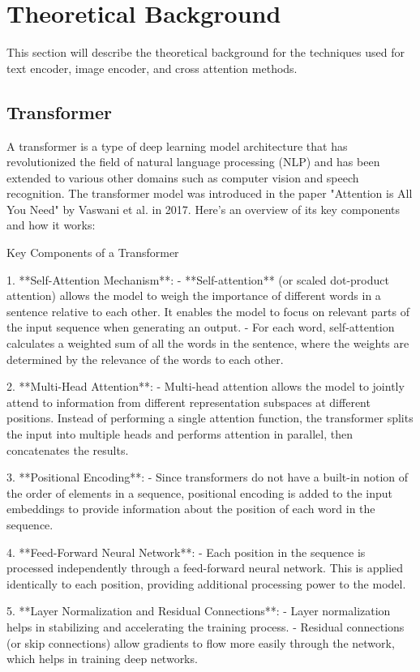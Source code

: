 \chapter{Theoretical Background}
This section will describe the theoretical background for the techniques used for text encoder, image encoder, and cross attention methods. 
\section{Transformer}
A transformer is a type of deep learning model architecture that has revolutionized the field of natural language processing (NLP) and has been extended to various other domains such as computer vision and speech recognition. The transformer model was introduced in the paper "Attention is All You Need" by Vaswani et al. in 2017. Here's an overview of its key components and how it works:

 Key Components of a Transformer

1. **Self-Attention Mechanism**:
   - **Self-attention** (or scaled dot-product attention) allows the model to weigh the importance of different words in a sentence relative to each other. It enables the model to focus on relevant parts of the input sequence when generating an output.
   - For each word, self-attention calculates a weighted sum of all the words in the sentence, where the weights are determined by the relevance of the words to each other.

2. **Multi-Head Attention**:
   - Multi-head attention allows the model to jointly attend to information from different representation subspaces at different positions. Instead of performing a single attention function, the transformer splits the input into multiple heads and performs attention in parallel, then concatenates the results.

3. **Positional Encoding**:
   - Since transformers do not have a built-in notion of the order of elements in a sequence, positional encoding is added to the input embeddings to provide information about the position of each word in the sequence.

4. **Feed-Forward Neural Network**:
   - Each position in the sequence is processed independently through a feed-forward neural network. This is applied identically to each position, providing additional processing power to the model.

5. **Layer Normalization and Residual Connections**:
   - Layer normalization helps in stabilizing and accelerating the training process.
   - Residual connections (or skip connections) allow gradients to flow more easily through the network, which helps in training deep networks.

